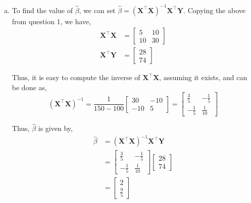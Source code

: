 \documentclass[12pt,letterpaper, onecolumn]{exam}
\begin{document}
\begin{questions}
\begin{solution}
\begin{enumerate}[a.)]
            The OLS estimator is thus,
            \begin{equation*}
                \hat{\beta} = ( \textbf{X}^\intercal\textbf{X})^{-1}\textbf{X}^\intercal\textbf{Y}
            \end{equation*}

        \item To find the value of $\hat{\beta}$, we can set $\hat{\beta}= ( \textbf{X}^\intercal\textbf{X})^{-1}\textbf{X}^\intercal\textbf{Y}$. Copying the above from question 1, we have,
        \begin{align*}
            \textbf{X}^\intercal\textbf{X} & = \left [\begin{array}{cc}
                5 & 10 \\
                10 & 30 
            \end{array} \right] \\
            \textbf{X}^\intercal\textbf{Y} & = \left [\begin{array}{c}
                28 \\ 74
            \end{array} \right]
        \end{align*}

        Thus, it is easy to compute the inverse of $\textbf{X}^\intercal\textbf{X}$, assuming it exists, and can be done as,
        \begin{equation*}
            (\textbf{X}^\intercal\textbf{X})^{-1}=\frac{1}{150 - 100} \left [\begin{array}{cc}
                30 & -10 \\
                -10 & 5 
            \end{array} \right] =  \left [\begin{array}{cc}
                \frac{3}{5} & -\frac{1}{5} \\
                -\frac{1}{5} & \frac{1}{10} 
            \end{array} \right]
        \end{equation*}

        Thus, $\hat{\beta}$ is given by,
        \begin{align*}
            \hat{\beta} & = ( \textbf{X}^\intercal\textbf{X})^{-1}\textbf{X}^\intercal\textbf{Y} \\
            & = \left [\begin{array}{cc}
                \frac{3}{5} & -\frac{1}{5} \\
                -\frac{1}{5} & \frac{1}{10} 
            \end{array} \right]\left [\begin{array}{c}
                28 \\ 74
            \end{array} \right] \\ 
            & = \left [\begin{array}{c}
                2 \\ \frac{9}{5}
            \end{array} \right]
        \end{align*}


\end{enumerate}
\end{solution}
\end{questions}
\end{document}
